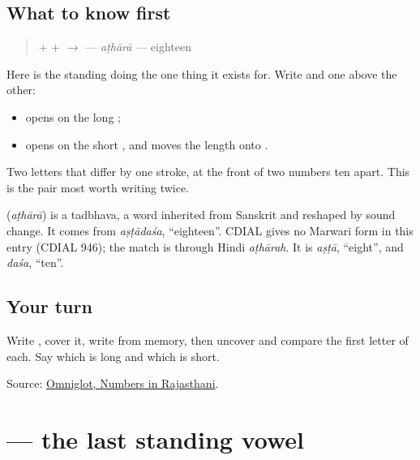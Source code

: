\subsection*{What to know first}
\begin{quote}
\textbf{} + \textbf{} + \textbf{} $\to$ \textbf{} — \emph{aṭhārā} — eighteen
\end{quote}

Here is the standing \textbf{} doing the one thing it exists for. Write \textbf{} and \textbf{} one above the other:

\begin{itemize}
\raggedright
  \item \textbf{} opens on the long \textbf{};
  \item \textbf{} opens on the short \textbf{}, and moves the length onto \textbf{}.
\end{itemize}

Two letters that differ by one stroke, at the front of two numbers ten apart. This is the pair most worth writing twice.

\begin{cousinweb}
\textbf{} (\emph{aṭhārā}) is a tadbhava, a word inherited from Sanskrit and reshaped by sound change. It comes from \emph{aṣṭādaśa}, \textquotedblleft{}eighteen\textquotedblright{}. CDIAL gives no Marwari form in this entry (CDIAL 946); the match is through Hindi \emph{aṭhārah}. It is \emph{aṣṭā}, \textquotedblleft{}eight\textquotedblright{}, and \emph{daśa}, \textquotedblleft{}ten\textquotedblright{}.
\end{cousinweb}

\subsection*{Your turn}
Write \textbf{}, cover it, write \textbf{} from memory, then uncover and compare the first letter of each. Say which is long and which is short.

\begin{tcolorbox}[breakable,colback=teal!4,colframe=teal!35!black,title={Before you move on}]
Source: \href{https://www.omniglot.com/language/numbers/rajasthani.htm}{Omniglot, Numbers in Rajasthani}.
\end{tcolorbox}
\section[\texorpdfstring{\mw{उ} (u)}{उ (u)}]{ — the last standing vowel}

